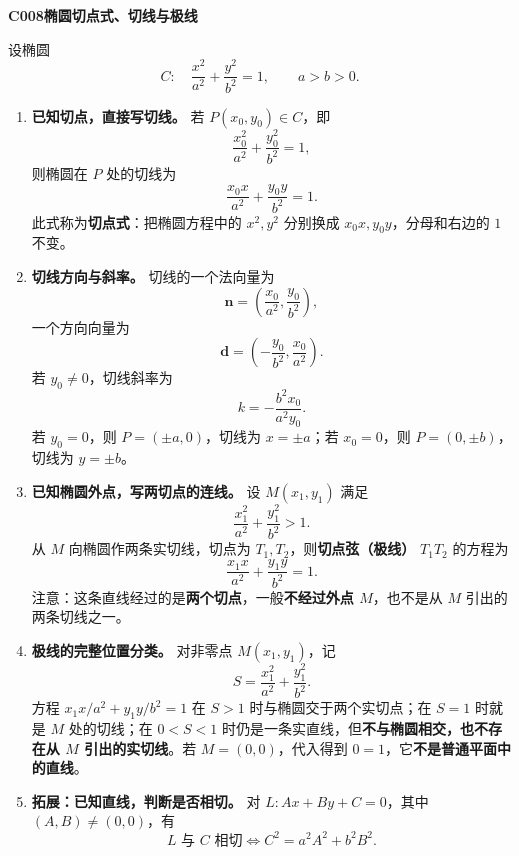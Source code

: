 \begin{statementbox}
\textbf{C008\quad 椭圆切点式、切线与极线}

设椭圆
\[
C:\quad \frac{x^2}{a^2}+\frac{y^2}{b^2}=1,\qquad a>b>0.
\]

\begin{enumerate}
    \item \textbf{已知切点，直接写切线。}
    若 $P(x_0,y_0)\in C$，即
    \[
    \frac{x_0^2}{a^2}+\frac{y_0^2}{b^2}=1,
    \]
    则椭圆在 $P$ 处的切线为
    \[
    \boxed{\frac{x_0x}{a^2}+\frac{y_0y}{b^2}=1.}
    \]
    此式称为\textbf{切点式}：把椭圆方程中的 $x^2,y^2$ 分别换成 $x_0x,y_0y$，分母和右边的 $1$ 不变。

    \item \textbf{切线方向与斜率。}
    切线的一个法向量为
    \[
    \boldsymbol n=\left(\frac{x_0}{a^2},\frac{y_0}{b^2}\right),
    \]
    一个方向向量为
    \[
    \boldsymbol d=\left(-\frac{y_0}{b^2},\frac{x_0}{a^2}\right).
    \]
    若 $y_0\ne0$，切线斜率为
    \[
    \boxed{k=-\frac{b^2x_0}{a^2y_0}.}
    \]
    若 $y_0=0$，则 $P=(\pm a,0)$，切线为 $x=\pm a$；若 $x_0=0$，则 $P=(0,\pm b)$，切线为 $y=\pm b$。

    \item \textbf{已知椭圆外点，写两切点的连线。}
    设 $M(x_1,y_1)$ 满足
    \[
    \frac{x_1^2}{a^2}+\frac{y_1^2}{b^2}>1.
    \]
    从 $M$ 向椭圆作两条实切线，切点为 $T_1,T_2$，则\textbf{切点弦（极线）} $T_1T_2$ 的方程为
    \[
    \boxed{\frac{x_1x}{a^2}+\frac{y_1y}{b^2}=1.}
    \]
    注意：这条直线经过的是\textbf{两个切点}，一般\textbf{不经过外点 $M$}，也不是从 $M$ 引出的两条切线之一。

    \item \textbf{极线的完整位置分类。}
    对非零点 $M(x_1,y_1)$，记
    \[
    S=\frac{x_1^2}{a^2}+\frac{y_1^2}{b^2}.
    \]
    方程 $x_1x/a^2+y_1y/b^2=1$ 在 $S>1$ 时与椭圆交于两个实切点；在 $S=1$ 时就是 $M$ 处的切线；在 $0<S<1$ 时仍是一条实直线，但\textbf{不与椭圆相交，也不存在从 $M$ 引出的实切线}。若 $M=(0,0)$，代入得到 $0=1$，它\textbf{不是普通平面中的直线}。

    \item \textbf{拓展：已知直线，判断是否相切。}
    对 $L:Ax+By+C=0$，其中 $(A,B)\ne(0,0)$，有
    \[
    \boxed{L\text{ 与 }C\text{ 相切}\iff C^2=a^2A^2+b^2B^2.}
    \]
\end{enumerate}
\end{statementbox}
